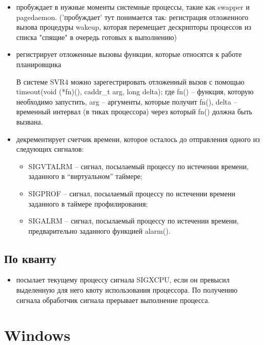 \begin{itemize}
	\item пробуждает в нужные моменты системные процессы, такие как swapper и pagedaemon. ('пробуждает' тут понимается так: регистрация отложенного вызова процедуры wakeup, которая перемещает дескрипторы процессов из списка "спящие" в очередь готовых к выполнению)
	\item регистрирует отложенные вызовы функции, которые относятся к работе планировщика
	
	В системе SVR4 можно зарегестрировать отложенный вызов с помощью timeout(void (*fn)(), caddr\_t arg, long delta); где fn() -- функция, которую необходимо запустить, arg -- аргументы, которые получит fn(), delta -- временный интервал (в тиках процессора) через который fn() должна быть вызвана.
	
	\item декрементирует счетчик времени, которое осталось до отправления одного из следующих сигналов:
	\begin{itemize}
		\item SIGVTALRM – сигнал, посылаемый процессу по истечении времени, заданного в “виртуальном” таймере;
		\item SIGPROF – сигнал, посылаемый процессу по истечении времени заданного в таймере профилирования;
		\item SIGALRM – сигнал, посылаемый процессу по истечении времени, предварительно заданного функцией alarm().	
	\end{itemize}
\end{itemize}

\subsection*{По кванту}

\begin{itemize}
	\item посылает текущему процессу сигнала SIGXCPU, если он превысил выделенную для него квоту использования процессора. По получению сигнала обработчик сигнала прерывает выполнение процесса.
\end{itemize}


\section{Windows}

